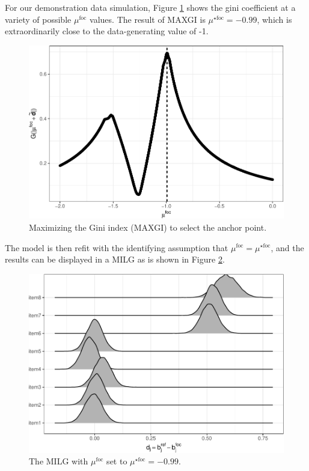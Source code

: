 \documentclass[
  11pt,
]{article}
\begin{document}
For our demonstration data simulation, Figure \ref{fig:ginipath} shows the gini coefficient at a variety of possible \(\mu^\text{foc}\) values. The result of MAXGI is \(\mu^{\star\text{foc}} = -0.99\), which is extraordinarily close to the data-generating value of -1.

\begin{figure}[H]

{\centering \includegraphics[width=0.7\linewidth]{paper_files/figure-latex/ginipath-1} 

}

\caption{Maximizing the Gini index (MAXGI) to select the anchor point.}\label{fig:ginipath}
\end{figure}

The model is then refit with the identifying assumption that \(\mu^{\text{foc}} = \mu^{\star\text{foc}}\), and the results can be displayed in a MILG as is shown in Figure \ref{fig:ginimilg}.

\begin{figure}[H]

{\centering \includegraphics[width=0.7\linewidth]{paper_files/figure-latex/ginimilg-1} 

}

\caption{The MILG with $\mu^{\text{foc}}$ set to $\mu^{\star\text{foc}} = -0.99$.}\label{fig:ginimilg}
\end{figure}
\end{document}
